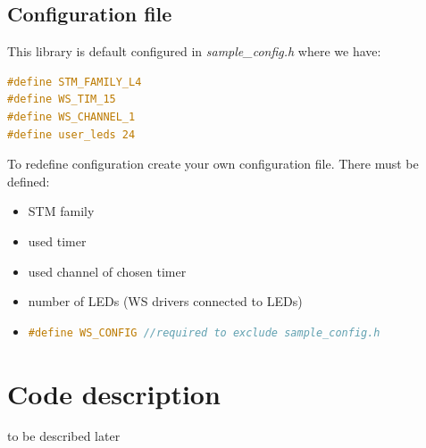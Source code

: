 \documentclass[]{article}
\begin{document}
	\subsection{Configuration file}
	This library is default configured in \textit{sample\_config.h} where we have:
				\begin{lstlisting}[language=C]
#define STM_FAMILY_L4
#define WS_TIM_15
#define WS_CHANNEL_1
#define user_leds 24
\end{lstlisting}
To redefine configuration create your own configuration file. There must be defined:
\begin{itemize}
	\item STM family
	\item used timer
	\item used channel of chosen timer
	\item number of LEDs (WS drivers connected to LEDs)
	\item \begin{lstlisting}[language=C]
#define WS_CONFIG //required to exclude sample_config.h \end{lstlisting}
	
\end{itemize} 
	\section{Code description}
	to be described later	
\end{document}

